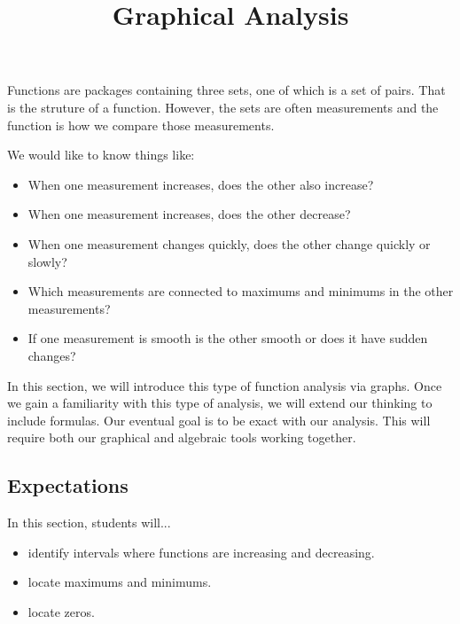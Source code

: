 \documentclass{ximera}
\title{Graphical Analysis}
\begin{document}
\begin{abstract}
\end{abstract}
\maketitle




Functions are packages containing three sets, one of which is a set of pairs.  That is the struture of a function.  However, the sets are often measurements and the function is how we compare those measurements.

We would like to know things like:

\begin{itemize}
\item When one measurement increases, does the other also increase?
\item When one measurement increases, does the other decrease?
\item When one measurement changes quickly, does the other change quickly or slowly?
\item Which measurements are connected to maximums and minimums in the other measurements?
\item If one measurement is smooth is the other smooth or does it have sudden changes?
\end{itemize}


In this section, we will introduce this type of function analysis via graphs. Once we gain a familiarity with this type of analysis, we will extend our thinking to include formulas.  Our eventual goal is to be exact with our analysis.  This will require both our graphical and algebraic tools working together.









\subsection{Expectations}

\begin{sectionOutcomes}
In this section, students will...

\begin{itemize}
\item identify intervals where functions are increasing and decreasing.
\item locate maximums and minimums.
\item locate zeros.
\end{itemize}
\end{sectionOutcomes}
\end{document}
